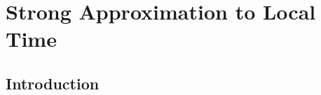 \chapter{Strong Approximation to Local Time}
\ifpdf
    \graphicspath{{Chapter3/Chapter3Figs/PNG/}{Chapter3/Chapter3Figs/PDF/}{Chapter3/Chapter3Figs/}}
\else
    \graphicspath{{Chapter3/Chapter3Figs/EPS/}{Chapter3/Chapter3Figs/}}
\fi

\section{Introduction}




